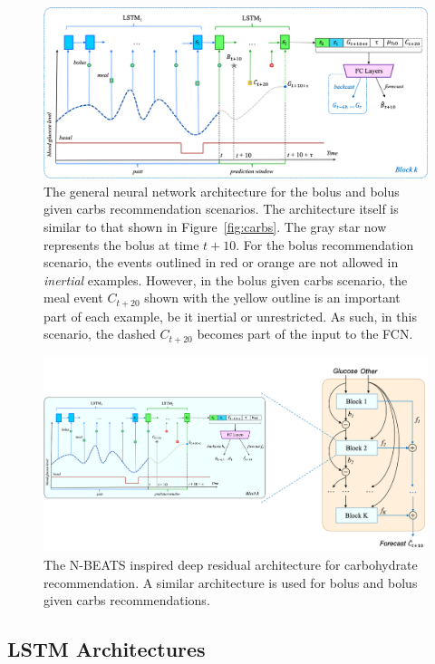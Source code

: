 \begin{figure}[t]
    \includegraphics[width=\textwidth]{bolus-block}
    \caption{The general neural network architecture for the bolus and bolus given carbs recommendation scenarios. The architecture itself is similar to that shown in Figure~\ref{fig:carbs}. The gray star now represents the bolus at time $t+10$. For the bolus recommendation scenario, the events outlined in red or orange are not allowed in {\it inertial} examples.  However, in the bolus given carbs scenario, the meal event $C_{t+20}$ shown with the yellow outline is an important part of each example, be it inertial or unrestricted. As such, in this scenario, the dashed $C_{t+20}$ becomes part of the input to the FCN.}
    \label{fig:bolus}
\end{figure}

\begin{figure}[t]
    \includegraphics[width=\textwidth]{carbs-nbeats}
    \caption{The N-BEATS inspired deep residual architecture for carbohydrate recommendation. A similar architecture is used for bolus and bolus given carbs recommendations.}
    \label{fig:nbeats}
\end{figure}


\subsection{LSTM Architectures}
\label{sec:lstm}

